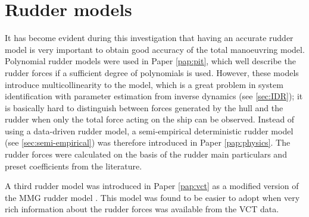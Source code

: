 \section{Rudder models} \label{sec:rudders}
It has become evident during this investigation that having an accurate rudder model is very important to obtain good accuracy of the total manoeuvring model. Polynomial rudder models were used in Paper \ref{pap:pit}, which well describe the rudder forces if a sufficient degree of polynomials is used. However, these models introduce multicollinearity to the model, which is a great problem in system identification with parameter estimation from inverse dynamics (see \autoref{sec:IDR}); it is basically hard to distinguish between forces generated by the hull and the rudder when only the total force acting on the ship can be observed. Instead of using a data-driven rudder model, a semi-empirical deterministic rudder model (see \autoref{sec:semi-empirical}) was therefore introduced in Paper \ref{pap:physics}. The rudder forces were calculated on the basis of the rudder main particulars and preset coefficients from the literature.

A third rudder model was introduced in Paper \ref{pap:vct} as a modified version of the MMG rudder model \cite{yasukawaIntroductionMMGStandard2015}. This model was found to be easier to adopt when very rich information about the rudder forces was available from the VCT data.


